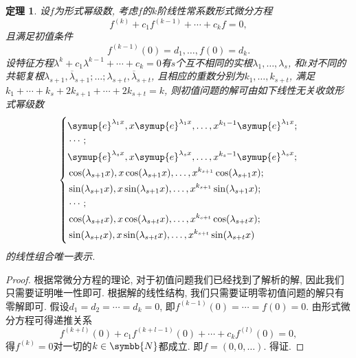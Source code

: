 \documentclass[chinese]{assignment}[2019/10/15]
\newcommand{\me}{\symup{e}}
\newcommand{\BN}{\symbb{N}}
\theoremstyle{plain}
\newtheorem{theorem}{定理}[section]
\begin{document}
    \begin{theorem}\label{thm: ode}
        设$f$为形式幂级数, 考虑$f$的$k$阶线性常系数形式微分方程
        \begin{equation}
            f^{(k)}+c_1f^{(k-1)}+\dotsb+c_kf = 0,
        \end{equation}
        且满足初值条件
        \begin{equation}
            f^{(k-1)}(0) = d_1, \dotsc, f(0) = d_k.
        \end{equation}
        设特征方程$\lambda^k+c_1\lambda^{k-1}+\dotsb+c_k=0$有$s$个互不相同的实根$\lambda_1, \dotsc, \lambda_s$, 和$t$对不同的共轭复根$\lambda_{s+1}, \overline{\lambda}_{s+1}; \dotsc; \lambda_{s+t}, \overline{\lambda}_{s+t}$, 且相应的重数分别为$k_1, \dotsc, k_{s+t}$, 满足$k_1 + \dotsb + k_s + 2k_{s+1} + \dotsb + 2k_{s+t} = k$, 则初值问题的解可由如下线性无关收敛形式幂级数
        \begin{equation}
            \left\{\begin{aligned}
                &\me^{\lambda_1x}, x\me^{\lambda_1x}, \dotsc, x^{k_1-1}\me^{\lambda_1x};\\
                &\dotsb;\\
                &\me^{\lambda_sx}, x\me^{\lambda_sx}, \dotsc, x^{k_s-1}\me^{\lambda_sx};\\
                &\cos(\lambda_{s+1}x), x\cos(\lambda_{s+1}x), \dotsc, x^{k_{s+1}}\cos(\lambda_{s+1}x);\\
                &\sin(\lambda_{s+1}x), x\sin(\lambda_{s+1}x), \dotsc, x^{k_{s+1}}\sin(\lambda_{s+1}x);\\
                &\dotsb;\\
                &\cos(\lambda_{s+t}x), x\cos(\lambda_{s+t}x), \dotsc, x^{k_{s+t}}\cos(\lambda_{s+t}x);\\
                &\sin(\lambda_{s+t}x), x\sin(\lambda_{s+t}x), \dotsc, x^{k_{s+t}}\sin(\lambda_{s+t}x)
            \end{aligned}\right.
        \end{equation}
        的线性组合唯一表示.
    \end{theorem}

    \begin{proof}
        根据常微分方程的理论, 对于初值问题我们已经找到了解析的解, 因此我们只需要证明唯一性即可. 根据解的线性结构, 我们只需要证明零初值问题的解只有零解即可. 假设$d_1 = d_2 = \dotsb = d_k = 0$, 即$f^{(k-1)}(0) = \dotsb = f(0) = 0$. 由形式微分方程可得递推关系
        \begin{equation}
            f^{(k+l)}(0)+c_1f^{(k+l-1)}(0)+\dotsb+c_kf^{(l)}(0) = 0,
        \end{equation}
        得$f^{(k)} = 0$对一切的$k\in\BN$都成立. 即$f=(0, 0, \dotsc)$. 得证.
    \end{proof}
\end{document}
